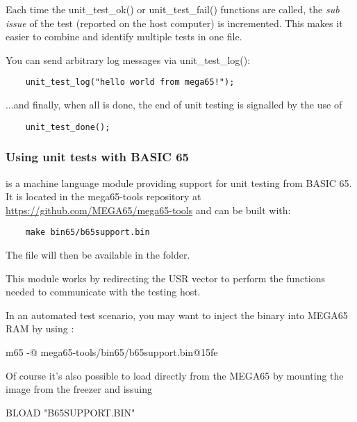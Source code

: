 Each time the unit\_test\_ok() or unit\_test\_fail() 
functions are called, the \textit{sub issue} of the test (reported on 
the host computer) is incremented. This makes it easier to combine and 
identify multiple tests in one file.

You can send arbitrary log messages via unit\_test\_log():

\begin{verbatim}
    unit_test_log("hello world from mega65!");
\end{verbatim}

...and finally, when all is done, the end of unit testing is signalled
by the use of

\begin{verbatim}
    unit_test_done();
\end{verbatim}


\subsubsection{Using unit tests with BASIC 65}

 is a machine language module providing support for 
unit testing from BASIC 65. It is located in the mega65-tools
repository at \url{https://github.com/MEGA65/mega65-tools} and can be built with:

\begin{verbatim}
    make bin65/b65support.bin
\end{verbatim}

The  file will then be available in the  folder.

This module works by redirecting the USR vector to perform the functions 
needed to communicate with the testing host.

In an automated test scenario, you may want to inject the  
binary into MEGA65 RAM by using :

    \begin{screencode}
        m65 -@ mega65-tools/bin65/b65support.bin@15fe
    \end{screencode}


Of course it's also possible to load  directly from the
MEGA65 by mounting the  image from the freezer and issuing

\begin{screencode}
    BLOAD "B65SUPPORT.BIN"
\end{screencode}

